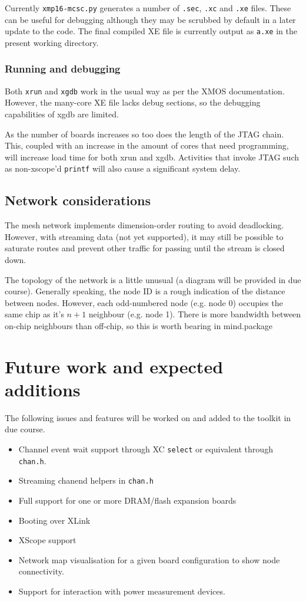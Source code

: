 \documentclass[12pt,a4paper,final,twoside]{article}
\begin{document}
Currently \texttt{xmp16-mcsc.py} generates a number of \texttt{.sec}, \texttt{.xc} and \texttt{.xe} files. These can be useful for debugging although they may be scrubbed by default in a later update to the code. The final compiled XE file is currently output as \texttt{a.xe} in the present working directory.

\subsubsection{Running and debugging}

Both \texttt{xrun} and \texttt{xgdb} work in the usual way as per the XMOS documentation. However, the many-core XE file lacks debug sections, so the debugging capabilities of xgdb are limited.

As the number of boards increases so too does the length of the JTAG chain. This, coupled with an increase in the amount of cores that need programming, will increase load time for both xrun and xgdb. Activities that invoke JTAG such as non-xscope'd \texttt{printf} will also cause a significant system delay.

\subsection{Network considerations}

The mesh network implements dimension-order routing to avoid deadlocking. However, with streaming data (not yet supported), it may still be possible to saturate routes and prevent other traffic for passing until the stream is closed down.

The topology of the network is a little unusual (a diagram will be provided in due course). Generally speaking, the node ID is a rough indication of the distance between nodes. However, each odd-numbered node (e.g. node 0) occupies the same chip as it's $n+1$ neighbour (e.g. node 1). There is more bandwidth between on-chip neighbours than off-chip, so this is worth bearing in mind.package

\section{Future work and expected additions}

The following issues and features will be worked on and added to the toolkit in due course.

\begin{itemize}
\item Channel event wait support through XC \texttt{select} or equivalent through \texttt{chan.h}.
\item Streaming chanend helpers in \texttt{chan.h}
\item Full support for one or more DRAM/flash expansion boards
\item Booting over XLink
\item XScope support
\item Network map visualisation for a given board configuration to show node connectivity.
\item Support for interaction with power measurement devices.
\end{itemize}
\end{document}
